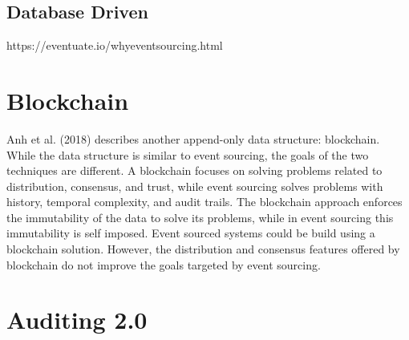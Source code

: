 \subsection{Database Driven}


https://eventuate.io/whyeventsourcing.html

\section{Blockchain}

Anh et al. (2018) describes another append-only data structure: blockchain. While the data structure is similar to event sourcing, the goals of the two techniques are different. A blockchain focuses on solving problems related to distribution, consensus, and trust, while event sourcing solves problems with history, temporal complexity, and audit trails. The blockchain approach enforces the immutability of the data to solve its problems, while in event sourcing this immutability is self imposed. Event sourced systems could be build using a blockchain solution. However, the distribution and consensus features offered by blockchain do not improve the goals targeted by event sourcing.

\section{Auditing 2.0}